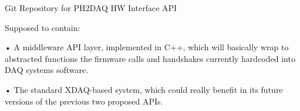 Git Repository for P\-H2\-D\-A\-Q H\-W Interface A\-P\-I

Supposed to contain\-:

• A middleware A\-P\-I layer, implemented in C++, which will basically wrap to abstracted functions the firmware calls and handshakes currently hardcoded into D\-A\-Q systems software.

• The standard X\-D\-A\-Q-\/based system, which could really benefit in its future versions of the previous two proposed A\-P\-Is. 